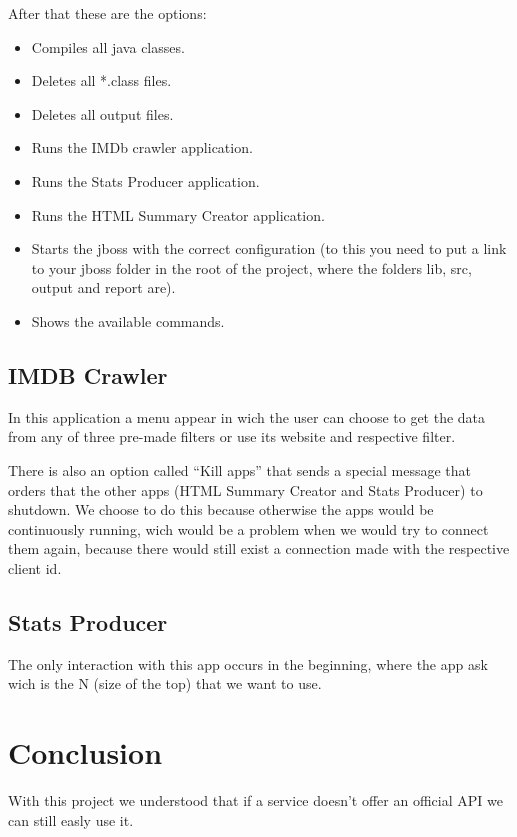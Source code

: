 \documentclass[a4paper]{article}
\begin{document}
After that these are the options:
\begin{itemize}
	\item [\textrr{make}]
		Compiles all java classes.
	\item [\textrr{make clean}]
		Deletes all *.class files.
	\item [\textrr{make clean-out}]
		Deletes all output files.
	\item [\textrr{make crawler}]
		Runs the IMDb crawler application.
	\item [\textrr{make stats}]
		Runs the Stats Producer application.
	\item [\textrr{make html}]
		Runs the HTML Summary Creator application.
	\item [\textrr{make jboss}]
		Starts the jboss with the correct configuration (to this you need to put a link to your jboss folder in the root of the project, where the folders lib, src, output and report are).
	\item [\textrr{make help}]
		Shows the available commands.
\end{itemize}

\subsection{IMDB Crawler}
\indent \indent In this application a menu appear in wich the user can choose to get the data from any of three pre-made filters or use its website and respective filter.

There is also an option called ``Kill apps'' that sends a special message that orders that the other apps (HTML Summary Creator and Stats Producer) to shutdown. We choose to do this because otherwise the apps would be continuously running, wich would be a problem when we would try to connect them again, because there would still exist a connection made with the respective client id.

\subsection{Stats Producer}
\indent \indent The only interaction with this app occurs in the beginning, where the app ask wich is the N (size of the top) that we want to use.
\clearpage

\section{Conclusion}
\indent \indent With this project we understood that if a service doesn't offer an official API we can still easly use it.
\end{document}
